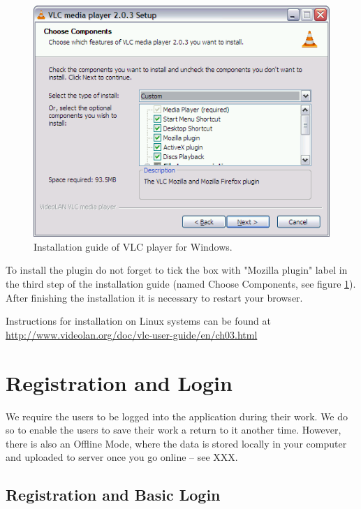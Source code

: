 \begin{figure}[h]
\begin{center}
\includegraphics[scale=0.4]{figures/vlc_installation.png}
\end{center}
\caption{Installation guide of VLC player for Windows.}
\label{fig:vlc}
\end{figure}

To install the plugin do not forget to tick the box with "Mozilla plugin" label in the third step of the installation guide (named Choose Components, see figure \ref{fig:vlc}). After finishing the installation it is necessary to restart your browser.

Instructions for installation on Linux systems can be found at \url{http://www.videolan.org/doc/vlc-user-guide/en/ch03.html}


\section{Registration and Login}

We require the users to be logged into the application during their work. We do so to enable the users to save their work a return to it another time. However, there is also an Offline Mode, where the data is stored locally in your computer and uploaded to server once you go online -- see XXX.

\subsection{Registration and Basic Login}

